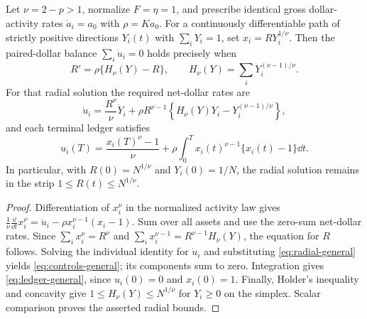 \documentclass[review,hidelinks,onefignum,onetabnum]{siamonline250211}%
\begin{document}
\begin{lemma}
\label{lem:radial-general}
Let $\nu=2-p>1$, normalize $F=\eta=1$, and prescribe
identical gross dollar-activity rates $\dot a_i=a_0$ with
$\rho=Ka_0$. For a continuously differentiable path of
strictly positive directions $Y_i(t)$ with $\sum_iY_i=1$,
set $x_i=R Y_i^{1/\nu}$. Then the paired-dollar balance
$\sum_i\dot u_i=0$ holds precisely when
\begin{equation}\label{eq:radial-general}
 R'=\rho\{H_\nu(Y)-R\},\qquad
 H_\nu(Y)=\sum_iY_i^{(\nu-1)/\nu}.
\end{equation}
For that radial solution the required net-dollar rates are
\begin{equation}\label{eq:controls-general}
 \dot u_i=\frac{R^\nu}{\nu}\dot Y_i
   +\rho R^{\nu-1}\left\{H_\nu(Y)Y_i
                               -Y_i^{(\nu-1)/\nu}\right\},
\end{equation}
and each terminal ledger satisfies
\begin{equation}\label{eq:ledger-general}
 u_i(T)=\frac{x_i(T)^\nu-1}{\nu}
  +\rho\int_0^T x_i(t)^{\nu-1}\{x_i(t)-1\}\dd t.
\end{equation}
In particular, with $R(0)=N^{1/\nu}$ and
$Y_i(0)=1/N$, the radial solution remains in the strip
$1\le R(t)\le N^{1/\nu}$.
\end{lemma}
\begin{proof}
Differentiation of $x_i^\nu$ in the normalized activity
law gives
$\frac1\nu\frac\dd{\dd t}x_i^\nu
=\dot u_i-\rho x_i^{\nu-1}(x_i-1)$.
Sum over all assets and use the zero-sum net-dollar rates.
Since $\sum_i x_i^\nu=R^\nu$ and
$\sum_i x_i^{\nu-1}=R^{\nu-1}H_\nu(Y)$,
the equation for $R$ follows. Solving the individual
identity for $\dot u_i$ and substituting
\eqref{eq:radial-general} yields
\eqref{eq:controls-general}; its components sum to zero.
Integration gives \eqref{eq:ledger-general}, since
$u_i(0)=0$ and $x_i(0)=1$.
Finally, Holder's inequality and concavity give
$1\le H_\nu(Y)\le N^{1/\nu}$ for $Y_i\ge0$ on the
simplex. Scalar comparison proves the asserted radial bounds.
\end{proof}
\end{document}
